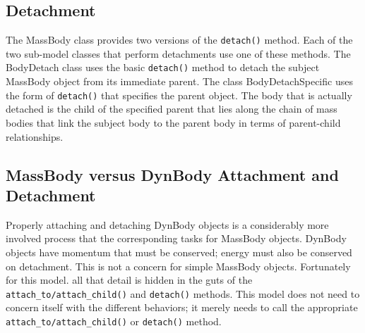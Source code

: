 \subsection{Detachment}
The MassBody class provides two versions of the {\tt detach()} method.
Each of the two sub-model classes that perform detachments use one
of these methods. The BodyDetach class uses the basic {\tt detach()}
method to detach the subject MassBody object from its immediate parent.
The class BodyDetachSpecific uses the form of {\tt detach()}
that specifies the parent object. The body that is actually detached
is the child of the specified parent that lies along the chain of mass bodies
that link the subject body to the parent body in terms of parent-child
relationships.

\subsection{MassBody versus DynBody Attachment and Detachment}
Properly attaching and detaching DynBody objects is a considerably more
involved process that the corresponding tasks for MassBody objects.
DynBody objects have momentum that must be conserved; energy must also
be conserved on detachment. This is not a concern for simple MassBody objects.
Fortunately for this model. all that detail is hidden in the guts of the
{\tt attach\_to/attach\_child()} and {\tt detach()} methods. This model does not need to concern
itself with the different behaviors; it merely needs to call the appropriate
{\tt attach\_to/attach\_child()} or {\tt detach()} method.
